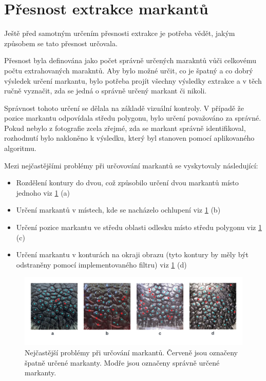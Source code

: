 \section{Přesnost extrakce markantů}

Ještě před samotným určením přesnosti extrakce je potřeba vědět, jakým způsobem se tato přesnost určovala.

Přesnost byla definována jako počet správně určených marakntů vůči celkovému počtu extrahovaných marakntů. Aby bylo možné určit, co je špatný a co dobrý výsledek určení markantu, bylo potřeba projít všechny výsledky extrakce a v těch ručně vyznačit, zda se jedná o správně určený markant či nikoli.

Správnost tohoto určení se dělala na základě vizuální kontroly. V případě že pozice markantu odpovídala středu polygonu, bylo určení považováno za správné. Pokud nebylo z fotografie zcela zřejmé, zda se markant správně identifikoval, rozhodnutí bylo nakloněno k výsledku, který byl stanoven pomocí aplikovaného algoritmu.


Mezi nejčastějšími problémy při určovování markantů se vyskytovaly následující:

\begin{itemize}
    \item Rozdělení kontury do dvou, což způsobilo určení dvou markantů místo jednoho viz \ref{chyby_v_exktrakci} (a)
    \item Určení markantů v místech, kde se nacházelo ochlupení viz \ref{chyby_v_exktrakci} (b)
    \item Určení pozice markantu ve středu oblasti odlesku místo středu polygonu viz \ref{chyby_v_exktrakci} (c)
    \item Určení markantu v konturách na okraji obrazu (tyto kontury by měly být odstraněny pomocí implementovaného filtru) viz \ref{chyby_v_exktrakci} (d)
\end{itemize}


\begin{figure}[h]
	\centering
	\includegraphics[width=1\textwidth]{obrazky/chyby_v_exktrakci.png}
	\caption{Nejčastější problémy při určování markantů. Červeně jsou označeny špatně určené markanty. Modře jsou označeny správně určené markanty.}
	\label{chyby_v_exktrakci}
\end{figure} 


